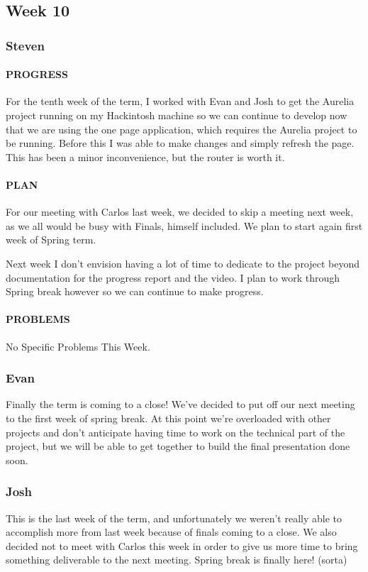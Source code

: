 \documentclass[onecolumn, draftclsnofoot,10pt, compsoc]{IEEEtran}
\begin{document}
\subsection{Week 10}
	\subsubsection{Steven}
	\paragraph{PROGRESS}
	For the tenth week of the term, I worked with Evan and Josh to get the Aurelia project running on my Hackintosh machine so we can continue to develop now that we are using the one page application, which requires the Aurelia project to be running. Before this I was able to make changes and simply refresh the page. This has been a minor inconvenience, but the router is worth it.
	
	\paragraph{PLAN}
	For our meeting with Carlos last week, we decided to skip a meeting next week, as we all would be busy with Finals, himself included. We plan to start again first week of Spring term. 
	
	Next week I don't envision having a lot of time to dedicate to the project beyond documentation for the progress report and the video. I plan to work through Spring break however so we can continue to make progress.
	
	\paragraph{PROBLEMS}
	No Specific Problems This Week.
	
	\subsubsection{Evan}
	Finally the term is coming to a close! We've decided to put off our next meeting to the first week of spring break. At this point we're overloaded with other projects and don't anticipate having time to work on the technical part of the project, but we will be able to get together to build the final presentation done soon.
	
	\subsubsection{Josh}
	This is the last week of the term, and unfortunately we weren't really able to accomplish more from last week because of finals coming to a close. We also decided not to meet with Carlos this week in order to give us more time to bring something deliverable to the next meeting. Spring break is finally here! (sorta)
\end{document}
